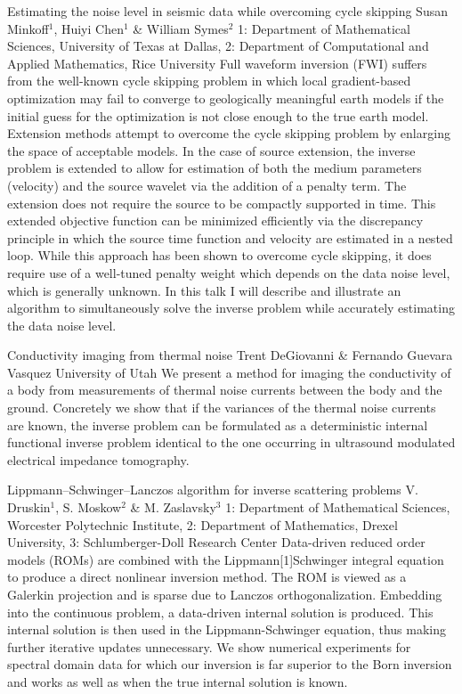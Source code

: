 \begin{addmargin}[2em]{0em}
\vspace{1.5ex}
\abs
{Estimating the noise level in seismic data while overcoming cycle skipping}
{Susan Minkoff$^{1}$, Huiyi Chen$^{1}$ \& William Symes$^{2}$}
{1: Department of Mathematical Sciences, University of Texas at Dallas, 2:  Department of Computational and Applied Mathematics, Rice University}
{Full waveform inversion (FWI) suffers from the well-known cycle skipping problem in which local gradient-based optimization may fail to converge to geologically meaningful earth models if the initial guess for the optimization is not close enough to the true earth model. Extension methods attempt to overcome the cycle skipping problem by enlarging the space of acceptable models. In the case of source extension, the inverse problem is extended to allow for estimation of both the medium parameters (velocity) and the source wavelet via the addition of a penalty term. The extension does not require the source to be compactly supported in time. This extended objective function can be minimized efficiently  via the discrepancy principle in which the source time function and velocity are estimated in a nested loop. While this approach has been shown to overcome cycle skipping, it does require use of a well-tuned penalty weight which depends on the data noise level, which is generally unknown. In this talk I will describe and illustrate an algorithm to simultaneously solve the inverse problem while accurately estimating the data noise level.}


\vspace{1.5ex}
\abs
{Conductivity imaging from thermal noise}
{Trent DeGiovanni \& Fernando Guevara Vasquez}
{University of Utah}
{We present a method for imaging the conductivity of a body from measurements of thermal noise currents between the body and the ground. Concretely we show that if the variances of the thermal noise currents are known, the inverse problem can be formulated as a deterministic internal functional inverse problem identical to the one occurring in ultrasound modulated electrical impedance tomography.}


\vspace{1.5ex}
\abs
{{L}ippmann--{S}chwinger--{L}anczos algorithm for inverse scattering problems}
{V. Druskin$^{1}$, S. Moskow$^{2}$ \& M. Zaslavsky$^{3}$}
{1: Department of Mathematical Sciences, Worcester Polytechnic Institute, 2: Department of Mathematics, Drexel University, 3: Schlumberger-Doll Research Center}
{Data-driven reduced order models (ROMs) are combined with the Lippmann[1]Schwinger integral equation to produce a direct nonlinear inversion method. The ROM is viewed as a Galerkin projection and is sparse due to Lanczos orthogonalization. Embedding into the continuous problem, a data-driven internal solution is produced. This internal solution is then used in the Lippmann-Schwinger equation, thus making further iterative updates unnecessary. We show numerical experiments for spectral domain data for which our inversion is far superior to the Born inversion and works as well as when the true internal solution is known.}





\end{addmargin}
